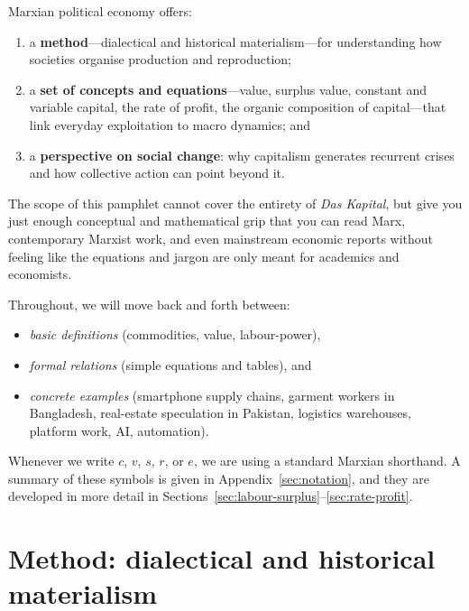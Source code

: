 Marxian political economy offers:

\begin{enumerate}[leftmargin=1.5em]
  \item a \textbf{method}---dialectical and historical materialism---for
  understanding how societies organise production and reproduction;

  \item a \textbf{set of concepts and equations}---value, surplus value,
  constant and variable capital, the rate of profit, the organic composition
  of capital---that link everyday exploitation to macro dynamics; and

  \item a \textbf{perspective on social change}: why capitalism generates
  recurrent crises and how collective action can point beyond it.
\end{enumerate}

The scope of this pamphlet cannot cover the entirety of \emph{Das Kapital}, but give you just enough
conceptual and mathematical grip that you can read Marx, contemporary Marxist
work, and even mainstream economic reports without feeling like the equations
and jargon are only meant for academics and economists.

Throughout, we will move back and forth between:

\begin{itemize}[leftmargin=1.5em]
  \item \emph{basic definitions} (commodities, value, labour-power),
  \item \emph{formal relations} (simple equations and tables), and
  \item \emph{concrete examples} (smartphone supply chains, garment workers in
  Bangladesh, real-estate speculation in Pakistan, logistics warehouses,
  platform work, AI, automation).
\end{itemize}

Whenever we write $c$, $v$, $s$, $r$, or $e$, we are using
a standard Marxian shorthand. A summary of these symbols is given in Appendix~\ref{sec:notation}, and they are developed
in more detail in Sections~\ref{sec:labour-surplus}--\ref{sec:rate-profit}.


\section{Method: dialectical and historical materialism}
\label{sec:method}

